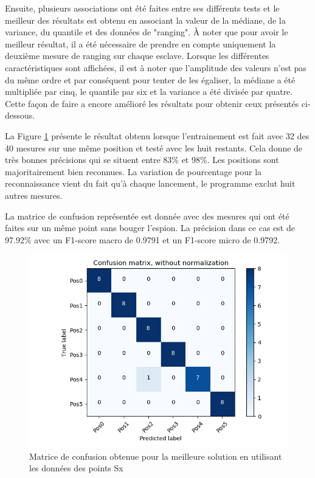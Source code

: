 Ensuite, plusieurs associations ont été faites entre ses différents tests et le meilleur des résultats est obtenu en associant la valeur de la médiane, de la variance, du quantile et des données de "ranging". À noter que pour avoir le meilleur résultat, il a été nécessaire de prendre en compte uniquement la deuxième mesure de ranging sur chaque esclave. Lorsque les différentes caractéristiques sont affichées, il est à noter que l'amplitude des valeurs n'est pas du même ordre et par conséquent pour tenter de les égaliser, la médiane a été multipliée par cinq, le quantile par six et la variance a été divisée par quatre. Cette façon de faire a encore amélioré les résultats pour obtenir ceux présentés ci-dessous.

La Figure \ref{fig:matPosSx} présente le résultat obtenu lorsque l'entrainement est fait avec 32 des 40 mesures sur une même position et testé avec les huit restants. Cela donne de très bonnes précisions qui se situent entre 83\% et 98\%. Les positions sont majoritairement bien reconnues. La variation de pourcentage pour la reconnaissance vient du fait qu'à chaque lancement, le programme exclut huit autres mesures.

La matrice de confusion représentée est donnée avec des mesures qui ont été faites sur un même point sans bouger l'espion. La précision dans ce cas est de 97.92\% avec un F1-score macro de 0.9791 et un F1-score micro de 0.9792. 

\begin{figure}[htp]
 \begin{center}
  \includegraphics[scale=0.5]{figures/mat_pos_Sx.PNG}
  \caption{Matrice de confusion obtenue pour la meilleure solution en utilisant les données des points Sx}
  \label{fig:matPosSx} %
 \end{center}
\end{figure}

